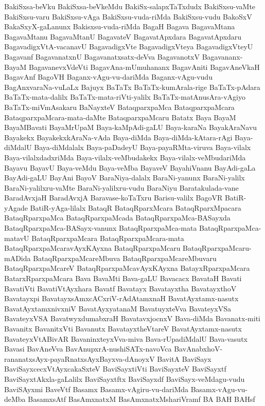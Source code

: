 {BakiSxsa-beVku
BakiSxsa-beVkeMdu
BakiSx-salapxTaTxdudx
BakiSxsu-vaMte
BakiSxsu-varu
BakiSxsu-vAga
BakiSxsu-vuda-riMda
BakiSxsu-vudu
BakoSxV
BakaSxyX-gaLanunx
Bakisxsu-vuda-riMda
BagaH
Bagava
BagavaMtana
BagavaMtanu
BagavaMtanU
BagavateV
BagavatApxdara
BagavatApxdaru
BagavadigxVtA-vacanavU
BagavadigxVte
BagavadigxVteya
BagavadigxVteyU
Bagavanf
BagavanatxnU
Bagavanatxsatx-deVva
BagavanotxV
Bagavananx-BayaM
BagavanevxVdeVti
BagavAna-mUmuhananx
BagavAniti
BagavAneVkaH
BagavAnf
BagoVH
Baganx-vAgu-vu-dariMda
Baganx-vAgu-vudu
BagAnxvaraNa-vuLaLx
Bajuyx
BaTaTx
BaTaTx-kumArala-rige
BaTaTx-pAdara
BaTaTx-mata-dalilx
BaTaTx-mata-riVti-yalilx
BaTaTx-matAnusAra-vAgiyo
BaTaTx-miVmAsakaru
BaNayxteV
BataqparxpaMca
BataqparxpaMcara
BataqparxpaMcara-mata-daMte
BataqparxpaMcaru
Batatx
Baya
BayaM
BayaMBavati
BayaMrUpaM
Baya-kaMpAdi-gaLU
Baya-karaNa
BayakAraNavu
Bayakekx
BayakekxkAraNa-vAda
Baya-diMda
Baya-diMda-kAtara-rAgi
Baya-diMdalU
Baya-diMdalalx
Baya-paDadeyU
Baya-payaRMta-viruva
Baya-vilalx
Baya-vilalxdadxriMda
Baya-vilalx-veMbudakekx
Baya-vilalx-veMbudariMda
Bayavu
BayavU
Baya-veMdu
Baya-veMba
BayaveV
BayahiVnanu
BayAdi-gaLa
BayAdi-gaLU
BayAni
BayoV
BaraNiya-dalalx
BaraNi-yanunx
BaraNi-yalilx
BaraNi-yalilxru-vaMte
BaraNi-yalilxru-vudu
BaraNiyu
Baratakulada-vane
BaradAvxjaH
BaradAvxjA
Baravase-koTaTxru
Barisu-valilx
BagoVR
BatiR-yAgade
BatiR-yAga-lilalx
BataqR
BataqRparxMcara
BataqRparxMpacara
BataqRparxpaMca
BataqRparxpaMcada
BataqRparxpaMca-BASayxda
BataqRparxpaMca-BASayx-vanunx
BataqRparxpaMca-mata
BataqRparxpaMca-matavU
BataqRparxpaMcara
BataqRparxpaMcara-mata
BataqRparxpaMcaravAyxKAyxna
BataqRparxpaMcaru
BataqRparxpaMcaru-mADida
BataqRparxpaMcareMbuva
BataqRparxpaMcareMbuvaru
BataqRparxpaMcareV
BataqRparxpaMcavAyxKAyxna
BatayxRparxpaMcara
BatarxRparxpaMcara
Bava
BavaMti
Bava-gaLU
Bavacacx
BavataH
Bavati
BavatiVti
BavatiVtAyxhara
Bavatf
Bavatayx
Bavatayxtha
BavatayxthoV
Bavatayxpi
BavatayxsAmxcACxriV-rAdAtamxnaH
BavatAyxtamx-nasutx
BavatAyxtamxnivxniV
BavatAyxyatanaM
BavatuyxteVva
BavateyxVSa
BavateyxVSA
BavatwyxdumabxraH
BavatavxjocnxV
Bava-diMda
Bavanatx-miti
Bavanitx
BavanitxVti
Bavanutx
BavatayxtheVtareV
BavatAyxtamx-nasutx
BavateyxVtABivAR
BavaninxteyxVva-miva
Bava-rUpadiMdalU
Bava-vasutx
Bavasi
BavAneVva
BavAnupxrA-nushiSATx-navoVca
BavAnabxhoV-rananatxsAyx-payaRnatxsAyxBayxva-dAnoyxV
BavitA
BaviSayx
BaviSayxcecxVtAyxcakaSxteV
BaviSayxtiVti
BaviSayxteV
BaviSayxtf
BaviSayxtAkxla-gaLalilx
BaviSayxtftx
BaviSayxdf
BaviSayx-veMdagu-vudu
BaviSAyxmi
BaveVtf
Basamx
Basamx-vAgiru-vu-dariMda
Basamx-vAgu-vu-deMba
BasamxsAtf
BasAmxnatxM
BasAmxnatxMshariVramf
BA
BAH
BAHsf
}
